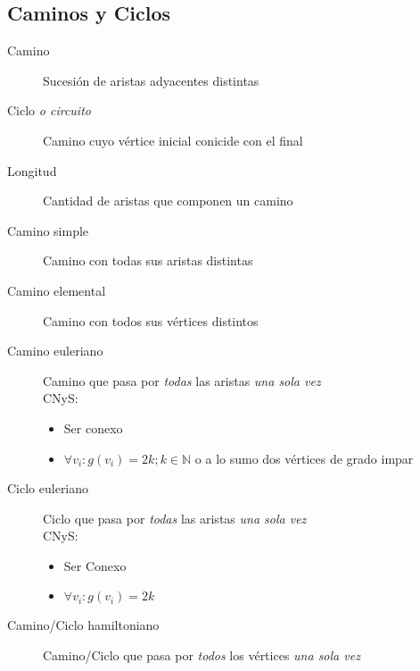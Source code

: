 \documentclass[a4paper,twocolumn]{article}
\numberwithin{equation}{section}
\numberwithin{figure}{section}
\numberwithin{table}{section}
\newcommand{\refa}[1]{}
\begin{document}
\subsection{Caminos y Ciclos}
\begin{description}
	\item[Camino]\label{camino} Sucesi\'on de aristas adyacentes\refa{adyacente} distintas
    \item[Ciclo \emph{o circuito}]\label{ciclo} Camino\refa{camino} cuyo v\'ertice inicial conicide con el final
    \item[Longitud] Cantidad de aristas que componen un camino\refa{camino}
    \item[Camino simple]\label{camino simple} Camino\refa{camino} con todas sus aristas distintas
   \item[Camino elemental] Camino\refa{camino} con todos sus v\'ertices distintos
   \item[Camino euleriano] Camino\refa{camino} que pasa por \emph{todas} las aristas \emph{una sola vez}
    	\\ CNyS:
        	\begin{itemize}
            	\item Ser conexo\refa{conexo}
                \item $\forall v_i : g(v_i) = 2k; k \in \mathbb{N}$ o a lo sumo dos v\'ertices de grado\refa{grado} impar
            \end{itemize}
   \item[Ciclo euleriano] Ciclo\refa{ciclo} que pasa por \emph{todas} las aristas \emph{una sola vez}
        	\\ CNyS:
        	\begin{itemize}
            	\item Ser Conexo\refa{conexo}
                \item $\forall v_i : g(v_i) = 2k$
            \end{itemize}
	\item[Camino/Ciclo hamiltoniano] Camino\refa{camino}/Ciclo\refa{ciclo} que pasa por \emph{todos} los v\'ertices \emph{una sola vez}   
\end{description}
\end{document}
